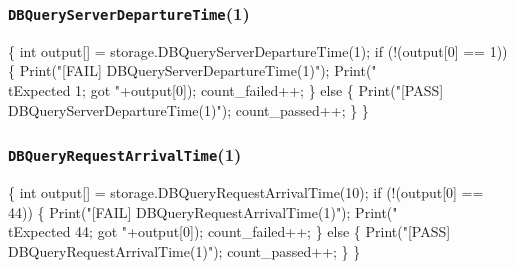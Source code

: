 \documentclass{article}
\def\nwendcode{\endtrivlist \endgroup}
\let\nwdocspar=\par
\theoremstyle{definition}
\begin{document}
\subsubsection{{\tt{}DBQueryServerDepartureTime}(1)}
\nwenddocs{}\endmoddef{}
\{
  int output[] = storage.DBQueryServerDepartureTime(1);
  if (!(output[0] == 1)) \{
    Print("[FAIL] DBQueryServerDepartureTime(1)");
    Print("\\tExpected 1; got "+output[0]);
    count_failed++;
  \} else \{
    Print("[PASS] DBQueryServerDepartureTime(1)");
    count_passed++;
  \}
\}
\nwendcode{}\nwdocspar
\subsubsection{{\tt{}DBQueryRequestArrivalTime}(1)}
\nwenddocs{}\endmoddef{}
\{
  int output[] = storage.DBQueryRequestArrivalTime(10);
  if (!(output[0] == 44)) \{
    Print("[FAIL] DBQueryRequestArrivalTime(1)");
    Print("\\tExpected 44; got "+output[0]);
    count_failed++;
  \} else \{
    Print("[PASS] DBQueryRequestArrivalTime(1)");
    count_passed++;
  \}
\}
\nwendcode{}\nwdocspar
\end{document}

